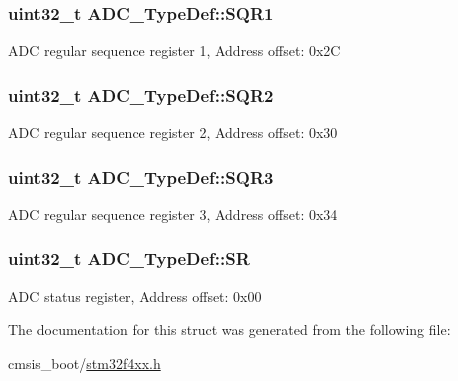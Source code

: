 \subsubsection[{\texorpdfstring{S\+Q\+R1}{SQR1}}]{ uint32\+\_\+t A\+D\+C\+\_\+\+Type\+Def\+::\+S\+Q\+R1}\hypertarget{struct_a_d_c___type_def_a0185aa54962ba987f192154fb7a2d673}{}\label{struct_a_d_c___type_def_a0185aa54962ba987f192154fb7a2d673}
A\+DC regular sequence register 1, Address offset\+: 0x2C 
\subsubsection[{\texorpdfstring{S\+Q\+R2}{SQR2}}]{ uint32\+\_\+t A\+D\+C\+\_\+\+Type\+Def\+::\+S\+Q\+R2}\hypertarget{struct_a_d_c___type_def_a6b6e55e6c667042e5a46a76518b73d5a}{}\label{struct_a_d_c___type_def_a6b6e55e6c667042e5a46a76518b73d5a}
A\+DC regular sequence register 2, Address offset\+: 0x30 
\subsubsection[{\texorpdfstring{S\+Q\+R3}{SQR3}}]{ uint32\+\_\+t A\+D\+C\+\_\+\+Type\+Def\+::\+S\+Q\+R3}\hypertarget{struct_a_d_c___type_def_a51dbdba74c4d3559157392109af68fc6}{}\label{struct_a_d_c___type_def_a51dbdba74c4d3559157392109af68fc6}
A\+DC regular sequence register 3, Address offset\+: 0x34 
\subsubsection[{\texorpdfstring{SR}{SR}}]{ uint32\+\_\+t A\+D\+C\+\_\+\+Type\+Def\+::\+SR}\hypertarget{struct_a_d_c___type_def_a9745df96e98f3cdc2d05ccefce681f64}{}\label{struct_a_d_c___type_def_a9745df96e98f3cdc2d05ccefce681f64}
A\+DC status register, Address offset\+: 0x00 

The documentation for this struct was generated from the following file\+:\begin{DoxyCompactItemize}
\item 
cmsis\+\_\+boot/\hyperlink{stm32f4xx_8h}{stm32f4xx.\+h}\end{DoxyCompactItemize}
